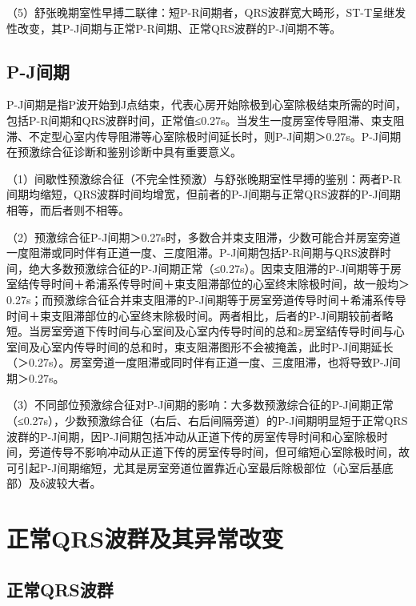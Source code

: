 （5）舒张晚期室性早搏二联律：短P-R间期者，QRS波群宽大畸形，ST-T呈继发性改变，其P-J间期与正常P-R间期、正常QRS波群的P-J间期不等。

\protect\hypertarget{text00008.htmlux5cux23subid34}{}{}

\section{P-J间期}

P-J间期是指P波开始到J点结束，代表心房开始除极到心室除极结束所需的时间，包括P-R间期和QRS波群时间，正常值≤0.27s。当发生一度房室传导阻滞、束支阻滞、不定型心室内传导阻滞等心室除极时间延长时，则P-J间期＞0.27s。P-J间期在预激综合征诊断和鉴别诊断中具有重要意义。

（1）间歇性预激综合征（不完全性预激）与舒张晚期室性早搏的鉴别：两者P-R间期均缩短，QRS波群时间均增宽，但前者的P-J间期与正常QRS波群的P-J间期相等，而后者则不相等。

（2）预激综合征P-J间期＞0.27s时，多数合并束支阻滞，少数可能合并房室旁道一度阻滞或同时伴有正道一度、三度阻滞。P-J间期包括P-R间期与QRS波群时间，绝大多数预激综合征的P-J间期正常（≤0.27s）。因束支阻滞的P-J间期等于房室结传导时间＋希浦系传导时间＋束支阻滞部位的心室终末除极时间，故一般均＞0.27s；而预激综合征合并束支阻滞的P-J间期等于房室旁道传导时间＋希浦系传导时间＋束支阻滞部位的心室终末除极时间。两者相比，后者的P-J间期较前者略短。当房室旁道下传时间与心室间及心室内传导时间的总和≥房室结传导时间与心室间及心室内传导时间的总和时，束支阻滞图形不会被掩盖，此时P-J间期延长（＞0.27s）。房室旁道一度阻滞或同时伴有正道一度、三度阻滞，也将导致P-J间期＞0.27s。

（3）不同部位预激综合征对P-J间期的影响：大多数预激综合征的P-J间期正常（≤0.27s），少数预激综合征（右后、右后间隔旁道）的P-J间期明显短于正常QRS波群的P-J间期，因P-J间期包括冲动从正道下传的房室传导时间和心室除极时间，旁道传导不影响冲动从正道下传的房室传导时间，但可缩短心室除极时间，故可引起P-J间期缩短，尤其是房室旁道位置靠近心室最后除极部位（心室后基底部）及δ波较大者。

\protect\hypertarget{text00009.html}{}{}

\protect\hypertarget{text00009.htmlux5cux23chapter9}{}{}

\chapter{正常QRS波群及其异常改变}

\protect\hypertarget{text00009.htmlux5cux23subid35}{}{}

\section{正常QRS波群}

